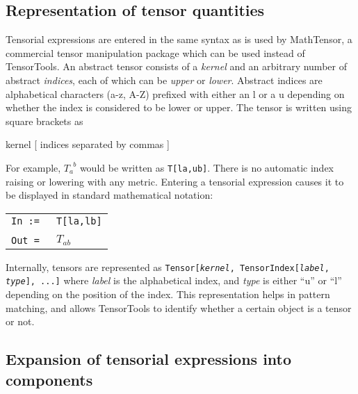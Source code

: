 \documentclass{report}
\newcommand{\mathdialogue}[2]
{
  \begin{center}
  \begin{tabular}[t]{rl}
  {\tt In := } & \parbox{10cm}{\tt {#1}} \\
\\
  {\tt Out = } & \parbox{10cm}{#2} \\
  \end{tabular}
  \end{center}
}
\begin{document}

\subsection{Representation of tensor quantities}

Tensorial expressions are entered in the same syntax as is used by
MathTensor, a commercial tensor manipulation package which can be used
instead of TensorTools.  An abstract tensor consists of a {\em kernel}
and an arbitrary number of abstract {\em indices}, each of which can
be {\em upper} or {\em lower}.  Abstract indices are alphabetical
characters (a-z, A-Z) prefixed with either an l or a u depending on
whether the index is considered to be lower or upper.  The tensor is
written using square brackets as
\begin{center}
\begin{tt}
kernel [ indices separated by commas ]
\end{tt}
\end{center}
%
For example, $T_a^{\phantom{a}b}$ would be written as {\tt T[la,ub]}.
There is no automatic index raising or lowering with any metric.
%
Entering a tensorial expression causes it to be displayed in standard
mathematical notation:
\mathdialogue{T[la,lb]}{$T_{ab}$}
%
Internally, tensors are represented as {\tt Tensor[{\it kernel},
TensorIndex[{\it label}, {\it type}], ...]} where {\it label} is the
alphabetical index, and {\it type} is either ``u'' or ``l'' depending
on the position of the index.  This representation helps in pattern
matching, and allows TensorTools to identify whether a certain object
is a tensor or not.

\subsection{Expansion of tensorial expressions into components}
\end{document}
